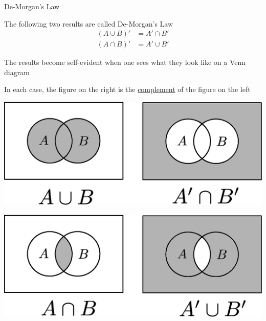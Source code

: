 \documentclass[14pt,fleqn]{extarticle}
\begin{document}
 
\begin{skill}
    \begin{narrow}
    
         De-Morgan's Law 
    \end{narrow}
    
    \reason 
    
    The following two results are called De-Morgan's Law
    \begin{align}
	\left(A\cup B \right)' &= A'\cap B' \\
	\left(A\cap B \right)' &= A'\cup B' 
\end{align}
    
    The results become self-evident when one sees what they look like on a Venn diagram\newline 
    
    In each case, the figure on the right is the \underline{complement} of the figure 
    on the left
    
    \begin{center}
\includegraphics[scale=0.35]{96-A.eps}
\end{center}

\begin{center}
\includegraphics[scale=0.35]{96-B.eps}
\end{center}
\end{skill}
\end{document}
